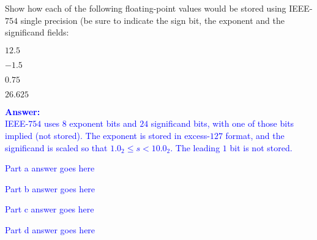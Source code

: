 \item{}
Show how each of the following floating-point values would be stored using
IEEE-$754$ single precision (be sure to indicate the sign bit, the exponent
and the significand fields:
\begin{list}{\textbf{}}{}
    \item $12.5$
    \item $-1.5$
    \item $0.75$
    \item $26.625$
\end{list}
\vskip12pt
\ifanswers
\textcolor{blue}{
\textbf{Answer:}\\
IEEE-$754$ uses $8$ exponent bits and $24$ significand bits, with one of those
bits implied (not stored). The exponent is stored in excess-$127$ format, and
the significand is scaled so that $1.0_2\le s<10.0_2$. The leading $1$ bit is
not stored.
\begin{list}{\textbf{}}{}
    \item Part a answer goes here
    \item Part b answer goes here
    \item Part c answer goes here
    \item Part d answer goes here
\end{list}
}
\newpage
\fi

